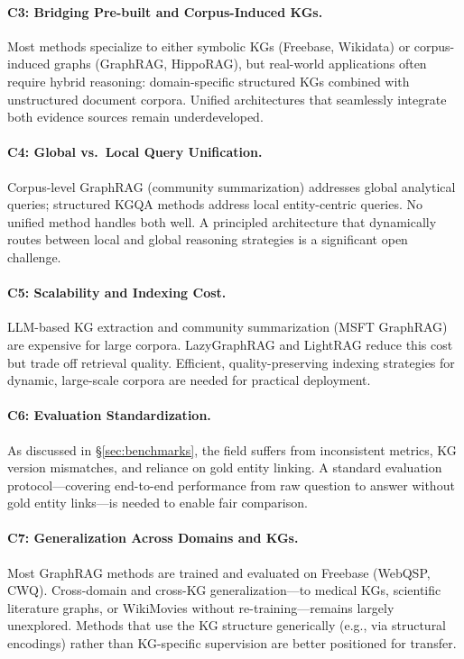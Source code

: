\documentclass[11pt]{article}
\begin{document}
\paragraph{C3: Bridging Pre-built and Corpus-Induced KGs.}
Most methods specialize to either symbolic KGs (Freebase, Wikidata) or corpus-induced graphs (GraphRAG, HippoRAG), but real-world applications often require hybrid reasoning: domain-specific structured KGs combined with unstructured document corpora. Unified architectures that seamlessly integrate both evidence sources remain underdeveloped.

\paragraph{C4: Global vs.\ Local Query Unification.}
Corpus-level GraphRAG (community summarization) addresses global analytical queries; structured KGQA methods address local entity-centric queries. No unified method handles both well. A principled architecture that dynamically routes between local and global reasoning strategies is a significant open challenge.

\paragraph{C5: Scalability and Indexing Cost.}
LLM-based KG extraction and community summarization (MSFT GraphRAG) are expensive for large corpora. LazyGraphRAG and LightRAG reduce this cost but trade off retrieval quality. Efficient, quality-preserving indexing strategies for dynamic, large-scale corpora are needed for practical deployment.

\paragraph{C6: Evaluation Standardization.}
As discussed in \S\ref{sec:benchmarks}, the field suffers from inconsistent metrics, KG version mismatches, and reliance on gold entity linking. A standard evaluation protocol—covering end-to-end performance from raw question to answer without gold entity links—is needed to enable fair comparison.

\paragraph{C7: Generalization Across Domains and KGs.}
Most GraphRAG methods are trained and evaluated on Freebase (WebQSP, CWQ). Cross-domain and cross-KG generalization—to medical KGs, scientific literature graphs, or WikiMovies without re-training—remains largely unexplored. Methods that use the KG structure generically (e.g., via structural encodings) rather than KG-specific supervision are better positioned for transfer.
\end{document}
